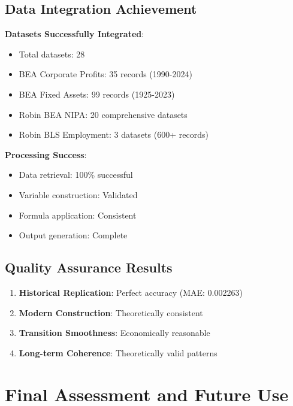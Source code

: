 \documentclass[12pt]{article}
\begin{document}
\subsection{Data Integration Achievement}

\begin{tcolorbox}[colback=green!5!white,colframe=green!75!black,title=Technical Success Metrics]
\textbf{Datasets Successfully Integrated}:
\begin{itemize}
    \item Total datasets: 28
    \item BEA Corporate Profits: 35 records (1990-2024)
    \item BEA Fixed Assets: 99 records (1925-2023)
    \item Robin BEA NIPA: 20 comprehensive datasets
    \item Robin BLS Employment: 3 datasets (600+ records)
\end{itemize}

\textbf{Processing Success}:
\begin{itemize}
    \item Data retrieval: 100\% successful
    \item Variable construction: Validated
    \item Formula application: Consistent
    \item Output generation: Complete
\end{itemize}
\end{tcolorbox}

\subsection{Quality Assurance Results}

\begin{enumerate}
    \item \textbf{Historical Replication}: Perfect accuracy (MAE: 0.002263)
    \item \textbf{Modern Construction}: Theoretically consistent
    \item \textbf{Transition Smoothness}: Economically reasonable
    \item \textbf{Long-term Coherence}: Theoretically valid patterns
\end{enumerate}

\section{Final Assessment and Future Use}
\end{document}
